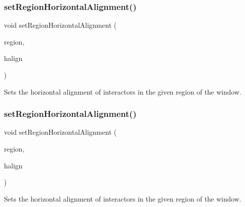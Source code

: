 \mbox{\label{classGWindow_aca8f01ef261afca9c843589e8be54134}} 
\subsubsection{\texorpdfstring{set\+Region\+Horizontal\+Alignment()}{setRegionHorizontalAlignment()}\hspace{0.1cm}{\footnotesize\ttfamily [1/2]}}
{\footnotesize\ttfamily void set\+Region\+Horizontal\+Alignment (\begin{DoxyParamCaption}\item[{\mbox{\hyperlink{classGWindow_a81a01a86de31071a92e6cce0bab9bc4b}{Region}}}]{region,  }\item[{Horizontal\+Alignment}]{halign }\end{DoxyParamCaption})\hspace{0.3cm}{\ttfamily [virtual]}}



Sets the horizontal alignment of interactors in the given region of the window. 

\mbox{\label{classGWindow_aefb97090ff4e149f8a0cce9efee3c451}} 
\subsubsection{\texorpdfstring{set\+Region\+Horizontal\+Alignment()}{setRegionHorizontalAlignment()}\hspace{0.1cm}{\footnotesize\ttfamily [2/2]}}
{\footnotesize\ttfamily void set\+Region\+Horizontal\+Alignment (\begin{DoxyParamCaption}\item[{const std\+::string \&}]{region,  }\item[{const std\+::string \&}]{halign }\end{DoxyParamCaption})\hspace{0.3cm}{\ttfamily [virtual]}}



Sets the horizontal alignment of interactors in the given region of the window. 

